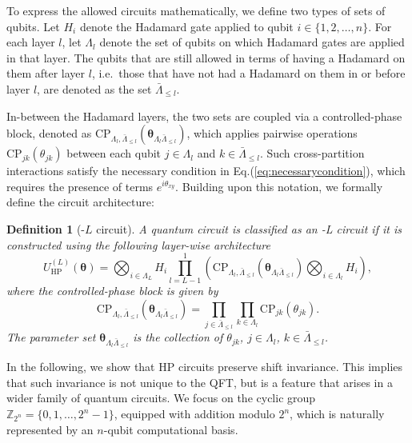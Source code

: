 \documentclass[reprint, aps, prl, superscriptaddress]{revtex4-2}
\newcommand{\rev}[1]{\textcolor{revisioncolor}{#1}}
\newcommand{\myqc}{\text{HP}}
\newcommand{\uqc}[1]{U_{\mathrm{HP}}^{(#1)}}
\newcommand{\cpgate}[3]{\mathrm{CP}_{#1, #2}(#3)}
\newcommand{\Lambdacomp}[1]{\bar{\Lambda}_{\leq #1}}
\newtheorem{definition}{Definition}
\begin{document}
To express the allowed circuits mathematically, we define two types of sets of qubits.
Let \(H_i\) denote the Hadamard gate applied to qubit
\(i\in\{1,2,\ldots,n\}\). For each layer \(l\), let
\(\Lambda_l\) denote the set of qubits on which
Hadamard gates are applied in that layer. The qubits that are still allowed in terms of having a Hadamard on them after layer $l$, i.e.\ those that have not had a Hadamard on them in or before layer $l$, are denoted as the set \(\Lambdacomp{l}\).

In-between the Hadamard layers, the two sets are coupled via a controlled-phase block, denoted as $\cpgate{\Lambda_l}{\Lambdacomp{l}}{\bm{\theta}_{\Lambda_l\Lambdacomp{l}}}$, which applies pairwise operations $\mathrm{CP}_{jk}(\theta_{jk})$ between each qubit $j \in \Lambda_l$ and $k \in \Lambdacomp{l}$. \rev{Such cross-partition interactions satisfy the necessary condition in Eq.(\ref{eq:necessarycondition}), which requires the presence of terms $e^{i\theta_{xy}}$. Building upon this notation, we formally define the circuit architecture:}
\begin{definition}[\myqc-$L$ circuit]
    A quantum circuit is classified as an \myqc-L circuit if it is constructed using the following layer-wise architecture
    \begin{equation}
    \label{eq:HP}
        \uqc{L}({\bm{\theta}}) = \bigotimes_{i \in \Lambda_L} H_{i}\prod_{l=L-1}^{1} \left( \cpgate{\Lambda_l}{\Lambdacomp{l}}{\bm{\theta}_{\Lambda_l\Lambdacomp{l}}} \bigotimes_{i \in \Lambda_l} H_{i} \right),
    \end{equation}
    where the controlled-phase block is given by
    \begin{equation}
        \cpgate{\Lambda_l}{\Lambdacomp{l}}{\bm{\theta}_{\Lambda_l\Lambdacomp{l}}} = \prod_{j \in \Lambdacomp{l}} \prod_{k \in \Lambda_l} \mathrm{CP}_{jk}(\theta_{jk}).
    \end{equation}
    The parameter set $\bm{\theta}_{\Lambda_l\Lambdacomp{l}}$ is the collection of $\theta_{jk}$, $j\in \Lambda_l$, $k \in \Lambdacomp{l}$. 
\end{definition}


    
In the following, we show that HP circuits preserve shift invariance. This implies that such invariance is not unique to the QFT, but is a feature that arises in a wider family of quantum circuits. \rev{We focus on the cyclic group $\mathbb{Z}_{2^n}=\{0,1,\ldots,2^n-1\}$, equipped with addition modulo $2^n$, which is naturally represented by an $n$-qubit computational basis.}
\end{document}

